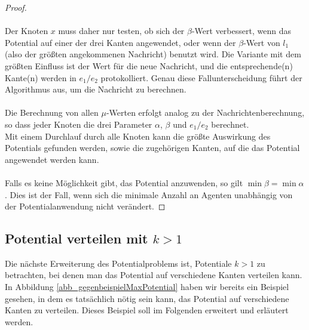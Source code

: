 \begin{proof}
		\\
		\\
		Der Knoten $x$ muss daher nur testen, ob sich der $\beta$-Wert verbessert, wenn das Potential auf einer der drei Kanten angewendet, oder wenn der $\beta$-Wert von $l_{1}$ (also der größten angekommenen Nachricht) benutzt wird. Die Variante mit dem größten Einfluss ist der Wert für die neue Nachricht, und die entsprechende(n) Kante(n) werden in $e_1/e_2$ protokolliert. Genau diese Fallunterscheidung führt der Algorithmus aus, um die Nachricht zu berechnen.
		\\
		\\
		Die Berechnung von allen $\mu$-Werten erfolgt analog zu der Nachrichtenberechnung, so dass jeder Knoten die drei Parameter $\alpha$, $\beta$ und $e_1/e_2$ berechnet. \\
		Mit einem Durchlauf durch alle Knoten kann die größte Auswirkung des Potentials gefunden werden, sowie die zugehörigen Kanten, auf die das Potential angewendet werden kann.
		\\
		\\
		Falls es keine Möglichkeit gibt, das Potential anzuwenden, so gilt $\min \beta = \min \alpha$. Dies ist der Fall, wenn sich die minimale Anzahl an Agenten unabhängig von der Potentialanwendung nicht verändert.
	\end{proof}
	
	

\subsection{Potential verteilen mit $k > 1$}\label{kap_pot>1_verteilt}

Die nächste Erweiterung des Potentialproblems ist, Potentiale $k > 1$ zu betrachten, bei denen man das Potential auf verschiedene Kanten verteilen kann.\\
In Abbildung \ref{abb_gegenbeispielMaxPotential} haben wir bereits ein Beispiel gesehen, in dem es tatsächlich nötig sein kann, das Potential auf verschiedene Kanten zu verteilen. Dieses Beispiel soll im Folgenden erweitert und erläutert werden.

